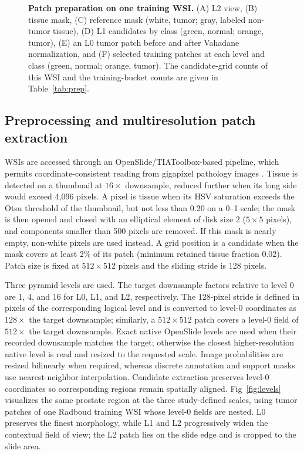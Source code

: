 \documentclass[10pt,letterpaper]{article}
\begin{document}
\begin{figure}[H]
\centering
\caption{\textbf{Patch preparation on one training WSI.} (A) L2 view, (B) tissue mask, (C) reference mask (white, tumor; gray, labeled non-tumor tissue), (D) L1 candidates by class (green, normal; orange, tumor), (E) an L0 tumor patch before and after Vahadane normalization, and (F) selected training patches at each level and class (green, normal; orange, tumor). The candidate-grid counts of this WSI and the training-bucket counts are given in Table~\ref{tab:prep}.}
\label{fig:prep}
\end{figure}

\subsection*{Preprocessing and multiresolution patch extraction}
WSIs are accessed through an OpenSlide/TIAToolbox-based pipeline, which permits coordinate-consistent reading from gigapixel pathology images \cite{bib31,bib32}. Tissue is detected on a thumbnail at $16\times$ downsample, reduced further when its long side would exceed 4,096 pixels. A pixel is tissue when its HSV saturation exceeds the Otsu threshold of the thumbnail, but not less than 0.20 on a 0--1 scale; the mask is then opened and closed with an elliptical element of disk size 2 ($5\times5$ pixels), and components smaller than 500 pixels are removed. If this mask is nearly empty, non-white pixels are used instead. A grid position is a candidate when the mask covers at least 2\% of its patch (minimum retained tissue fraction 0.02). Patch size is fixed at $512\times512$ pixels and the sliding stride is 128 pixels.

Three pyramid levels are used. The target downsample factors relative to level 0 are 1, 4, and 16 for L0, L1, and L2, respectively. The 128-pixel stride is defined in pixels of the corresponding logical level and is converted to level-0 coordinates as $128\times$ the target downsample; similarly, a $512\times512$ patch covers a level-0 field of $512\times$ the target downsample. Exact native OpenSlide levels are used when their recorded downsample matches the target; otherwise the closest higher-resolution native level is read and resized to the requested scale. Image probabilities are resized bilinearly when required, whereas discrete annotation and support masks use nearest-neighbor interpolation. Candidate extraction preserves level-0 coordinates so corresponding regions remain spatially aligned. Fig~\ref{fig:levels} visualizes the same prostate region at the three study-defined scales, using tumor patches of one Radboud training WSI whose level-0 fields are nested. L0 preserves the finest morphology, while L1 and L2 progressively widen the contextual field of view; the L2 patch lies on the slide edge and is cropped to the slide area.
\end{document}
